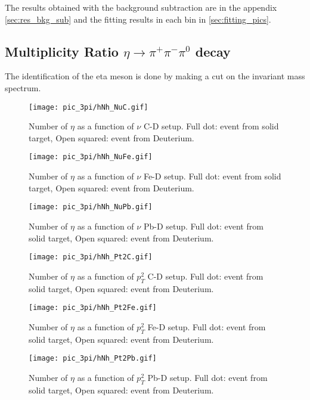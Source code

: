 The results obtained with the background subtraction are in the appendix \ref{sec:res_bkg_sub} and the fitting results in each bin in \ref{sec:fitting_pics}.

%
\subsection{Multiplicity Ratio $\eta \rightarrow \pi^+\pi^-\pi^0$ decay}
The identification of the eta meson is done by making a cut on the invariant mass spectrum.

%
\begin{figure}[H]
\centering
\texttt{[image: pic\_3pi/hNh\_NuC.gif]}
\caption{Number of $\eta$ as a function of $\nu$ C-D setup. Full dot: event from solid target, Open squared: event from Deuterium.}
\label{fig:Nh_eta_3pi_Nu_C}
\end{figure}

\begin{figure}[H]
\centering
\texttt{[image: pic\_3pi/hNh\_NuFe.gif]}
\caption{Number of $\eta$ as a function of $\nu$ Fe-D setup. Full dot: event from solid target, Open squared: event from Deuterium.}
\label{fig:Nh_eta_3pi_Nu_Fe}
\end{figure}

\begin{figure}[H]
\centering
\texttt{[image: pic\_3pi/hNh\_NuPb.gif]}
\caption{Number of $\eta$ as a function of $\nu$ Pb-D setup. Full dot: event from solid target, Open squared: event from Deuterium.}
\label{fig:Nh_eta_3pi_Nu_Pb}
\end{figure}

\begin{figure}[H]
\centering
\texttt{[image: pic\_3pi/hNh\_Pt2C.gif]}
\caption{Number of $\eta$ as a function of $p_T^2$ C-D setup. Full dot: event from solid target, Open squared: event from Deuterium.}
\label{fig:Nh_eta_3pi_Pt2_C}
\end{figure}

\begin{figure}[H]
\centering
\texttt{[image: pic\_3pi/hNh\_Pt2Fe.gif]}
\caption{Number of $\eta$ as a function of $p_T^2$ Fe-D setup. Full dot: event from solid target, Open squared: event from Deuterium.}
\label{fig:Nh_eta_3pi_Pt2_Fe}
\end{figure}

\begin{figure}[H]
\centering
\texttt{[image: pic\_3pi/hNh\_Pt2Pb.gif]}
\caption{Number of $\eta$ as a function of $p_T^2$ Pb-D setup. Full dot: event from solid target, Open squared: event from Deuterium.}
\label{fig:Nh_eta_3pi_Pt2_Pb}
\end{figure}



